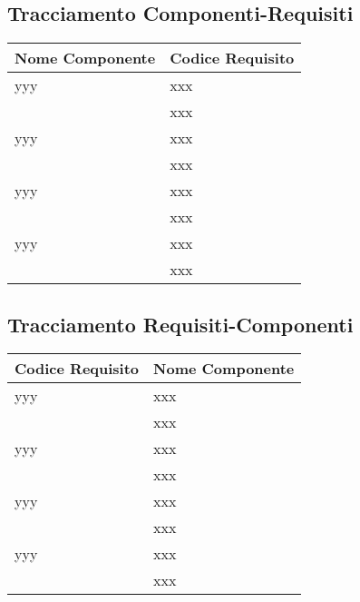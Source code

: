 	\newpage
	\subsection{Tracciamento Componenti-Requisiti}
	
	\begin{longtable}{ p{4cm} | p{12cm} }
		\hline
		\textbf{Nome Componente} & \textbf{Codice Requisito}  \\
		\hline yyy
		& xxx \\ 
		& xxx \\
		\hline yyy
		& xxx \\ 
		& xxx \\
		\hline yyy
		& xxx \\ 
		& xxx \\
		\hline yyy
		& xxx \\ 
		& xxx \\
		\hline			
	\end{longtable}

	\newpage
	\subsection{Tracciamento Requisiti-Componenti}
	
	\begin{longtable}{ p{4cm} | p{12cm} }
		\hline
		\textbf{Codice Requisito} & \textbf{Nome Componente} \\
		\hline yyy
		& xxx \\ 
		& xxx \\
		\hline yyy
		& xxx \\ 
		& xxx \\
		\hline yyy
		& xxx \\ 
		& xxx \\
		\hline yyy
		& xxx \\ 
		& xxx \\
		\hline			
	\end{longtable}